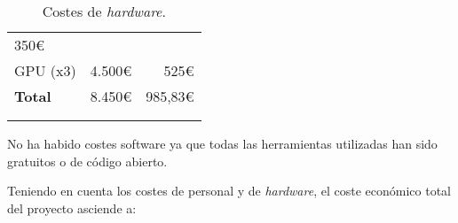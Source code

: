 \begin{longtable}[]{@{}lrr@{}}
\begin{minipage}[t]{0.32\columnwidth}
		350\euro{}\strut
	\end{minipage}\tabularnewline
	\begin{minipage}[t]{0.29\columnwidth}\raggedright\strut
		GPU (x3)\strut
	\end{minipage} & \begin{minipage}[t]{0.18\columnwidth}\raggedright\strut
		4.500\euro{}\strut
	\end{minipage} & \begin{minipage}[t]{0.32\columnwidth}\raggedright\strut
		525\euro{}\strut
	\end{minipage}\tabularnewline
	\midrule
	\begin{minipage}[t]{0.29\columnwidth}\raggedright\strut
		\textbf{Total}\strut
	\end{minipage} & \begin{minipage}[t]{0.18\columnwidth}\raggedright\strut
		8.450\euro{}\strut
	\end{minipage} & \begin{minipage}[t]{0.32\columnwidth}\raggedright\strut
		985,83\euro{}\strut
	\end{minipage}\tabularnewline
	\bottomrule
	\\
	\caption{Costes de \emph{hardware}.}
\end{longtable}

No ha habido costes software ya que todas las herramientas utilizadas han sido gratuitos o de código abierto.

Teniendo en cuenta los costes de personal y de \textit{hardware}, el coste económico total del proyecto asciende a:

